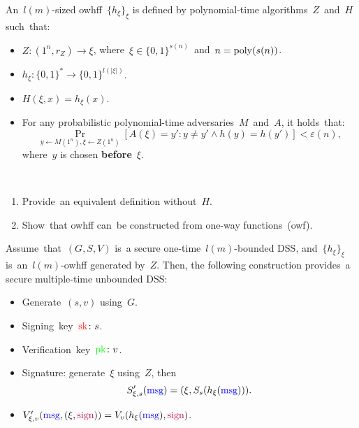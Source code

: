 \begin{definition}
    An~$l(m)$-sized owhff~$\{h_{\xi}\}_{\xi}$ is defined by polynomial-time algorithms~$Z$~and~$H$ such~that:

    \begin{itemize}
        \item $Z \colon (1^{n}, r_Z) \to \xi$, where~$\xi \in \{0, 1\}^{s(n)}$~and~$n = \operatorname{poly}(s(n))$.
        \item $h_{\xi} \colon \{0, 1\}^{*} \to \{0, 1\}^{l(|\xi|)}$.
        \item $H(\xi, x) = h_\xi(x)$.
        \item For any probabilistic polynomial-time adversaries~$M$~and~$A$, it holds~that:
            \[
                \Pr_{y \gets M(1^{n}), \xi \gets Z(1^{n})}[A(\xi) = y' \colon y \neq y' \wedge h(y) = h(y')] < \varepsilon(n),
            \]
            where~$y$ is chosen \textbf{before}~$\xi$.
    \end{itemize}
\end{definition}

\begin{exercise} ~
    \begin{enumerate}
        \item Provide~an equivalent definition without~$H$.
        \item Show~that owhff can~be constructed from one-way functions~(owf).
    \end{enumerate}
\end{exercise}

\begin{theorem} 
    Assume~that~$(G, S, V)$ is~a secure one-time~$l(m)$-bounded DSS, and~$\{h_{\xi}\}_{\xi}$ is~an~$l(m)$-owhff generated by~$Z$.
    Then, the following construction provides~a secure multiple-time unbounded DSS:
    \begin{itemize}
        \item Generate~$(s, v)$ using~$G$.
        \item Signing~key~$\textcolor{red}{\text{sk}} \colon s$.
        \item Verification~key~$\textcolor{green}{\text{pk}} \colon v$.
        \item Signature: generate~$\xi$ using~$Z$, then
            \[
                S'_{\xi, s}(\textcolor{blue}{\text{msg}}) = (\xi, S_s(h_\xi(\textcolor{blue}{\text{msg}}))).
            \]
        \item $V'_{\xi, v}(\textcolor{blue}{\text{msg}}, (\xi, \textcolor{purple}{\text{sign}})) = V_v(h_\xi(\textcolor{blue}{\text{msg}}), \textcolor{purple}{\text{sign}})$.
    \end{itemize}
\end{theorem}

